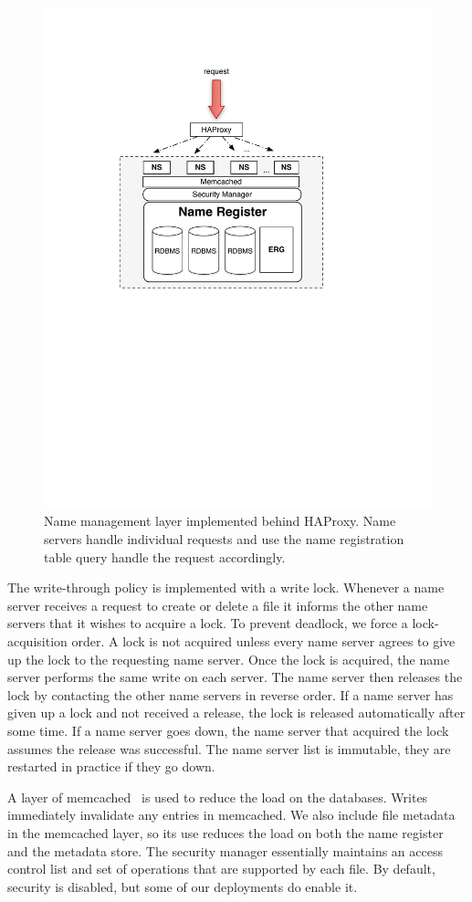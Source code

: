 \begin{figure}[h!] %
\centering
\includegraphics[width=.55\columnwidth]{figs/name_reg}
\caption{Name management layer implemented behind HAProxy.  Name servers handle individual requests and use the name registration table
query handle the request accordingly.}
\label{fig:nameserver}
\end{figure}

The write-through policy is implemented with a write lock.  Whenever a name server receives a request to create or delete a file it informs the
other name servers that it wishes to acquire a lock.  To prevent deadlock, we force a lock-acquisition order.  A lock is not acquired unless every
name server agrees to give up the lock to the requesting name server.  Once the lock is acquired, the name server performs the same write on each
server.  The name server then releases the lock by contacting the other name servers in reverse order.  If a name server has given up a lock
and not received a release, the lock is released automatically after some time.  If a name server goes down, the name server that acquired the lock
assumes the release was successful.  The name server list is immutable, they are restarted in practice if they go down.

A layer of memcached~\cite{memcached} is used to reduce the load on the databases.  Writes immediately invalidate any entries in memcached.  
We also include file metadata in the memcached layer, so its use reduces the load on both the name register and the metadata store.
The security manager essentially maintains an access control list and set of operations that are supported by each file.  By default, 
security is disabled, but some of our deployments do enable it.

